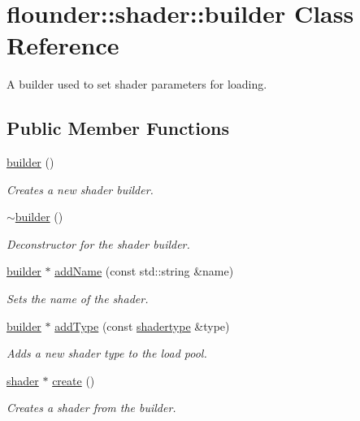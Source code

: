 \hypertarget{classflounder_1_1shader_1_1builder}{}\section{flounder\+:\+:shader\+:\+:builder Class Reference}
\label{classflounder_1_1shader_1_1builder}


A builder used to set shader parameters for loading.  


\subsection*{Public Member Functions}
\begin{DoxyCompactItemize}
\item 
\hyperlink{classflounder_1_1shader_1_1builder_a32776e257f27affda639c94667c07236}{builder} ()
\begin{DoxyCompactList}\small\item\em Creates a new shader builder. \end{DoxyCompactList}\item 
\hyperlink{classflounder_1_1shader_1_1builder_a80698ba04f5e74ac0a0023384988a55d}{$\sim$builder} ()
\begin{DoxyCompactList}\small\item\em Deconstructor for the shader builder. \end{DoxyCompactList}\item 
\hyperlink{classflounder_1_1shader_1_1builder}{builder} $\ast$ \hyperlink{classflounder_1_1shader_1_1builder_adb72c6a3a95ee90a1ff8616af3f2ba99}{add\+Name} (const std\+::string \&name)
\begin{DoxyCompactList}\small\item\em Sets the name of the shader. \end{DoxyCompactList}\item 
\hyperlink{classflounder_1_1shader_1_1builder}{builder} $\ast$ \hyperlink{classflounder_1_1shader_1_1builder_ac994656b2088dc292ff04de8b24ebdcf}{add\+Type} (const \hyperlink{structflounder_1_1shadertype}{shadertype} \&type)
\begin{DoxyCompactList}\small\item\em Adds a new shader type to the load pool. \end{DoxyCompactList}\item 
\hyperlink{classflounder_1_1shader}{shader} $\ast$ \hyperlink{classflounder_1_1shader_1_1builder_a99923013d39273486149c8fd54f6f9a9}{create} ()
\begin{DoxyCompactList}\small\item\em Creates a shader from the builder. \end{DoxyCompactList}\end{DoxyCompactItemize}

